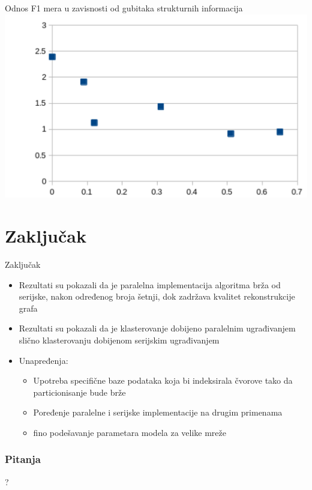 \documentclass{beamer}
\begin{document}
\begin{frame}{Odnos F1 mera u zavisnosti od gubitaka strukturnih informacija}
    \includegraphics[height=0.8\textheight]{png/grafik.png}
\end{frame}

\section{Zaključak}
\begin{frame}{Zaključak}
    \begin{itemize}
        \item Rezultati su pokazali da je paralelna implementacija algoritma brža od serijske, nakon određenog broja šetnji, dok zadržava kvalitet rekonstrukcije grafa
        \item Rezultati su pokazali da je klasterovanje dobijeno paralelnim ugrađivanjem slično klasterovanju dobijenom serijskim ugrađivanjem
        \item Unapređenja:
        \begin{itemize}
            \item Upotreba specifične baze podataka koja bi indeksirala čvorove tako da particionisanje bude brže
            \item Poređenje paralelne i serijske implementacije na drugim primenama
            \item fino podešavanje parametara modela za velike mreže 
        \end{itemize}
    \end{itemize}
\end{frame}



\begin{frame}
	\frametitle{Pitanja}
	\begin{center}
		\huge{?}
	\end{center}
\end{frame}
\end{document}
